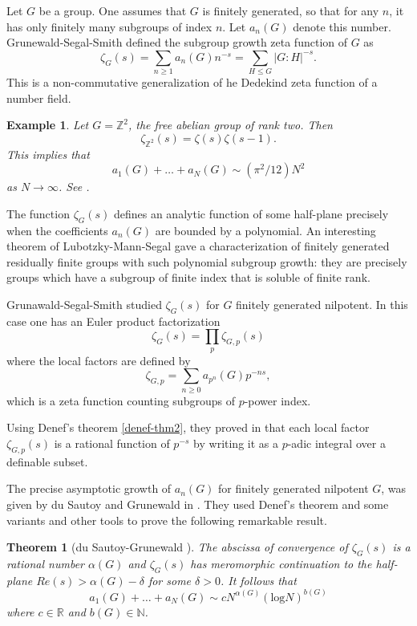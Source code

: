 \documentclass[12pt]{amsart}
\def\R{\mathbb{R}}
\def\N{\mathbb{N}}
\def\Z{\mathbb{Z}}
\def\R{\mathbb{R}}
\newtheorem{thm}{Theorem}[section]
\newtheorem{ex}{Example}[section]
\numberwithin{equation}{section}
\begin{document}
Let $G$ be a group. One assumes that $G$ is finitely generated, so that for any $n$, it has only finitely 
many subgroups of index $n$. Let $a_n(G)$ denote this number. Grunewald-Segal-Smith 
defined the subgroup growth zeta function of $G$ as 
$$\zeta_G(s)=\sum_{n\geq 1} a_n(G) n^{-s}=\sum_{H \leq G} |G:H|^{-s}.$$
This is a non-commutative generalization of he Dedekind zeta function of a number field.

\begin{ex} Let $G=\Z^2$, the free abelian group of rank two. Then $$\zeta_{\Z^2}(s)=\zeta(s)\zeta(s-1).$$ 
This implies that 
$$a_1(G)+\dots+a_N(G) \sim (\pi^2/12)N^2$$
as $N\rightarrow \infty$. See \cite{alex-dan-book}.

\end{ex}

The function $\zeta_G(s)$ defines an analytic function of some half-plane precisely when the coefficients $a_n(G)$ 
are bounded by a polynomial. An interesting theorem of Lubotzky-Mann-Segal \cite{LMS} gave a characterization of finitely generated residually finite groups with such polynomial subgroup growth: they are precisely groups which have a subgroup 
of finite index that is soluble of finite rank.

Grunawald-Segal-Smith \cite{GSS} studied $\zeta_G(s)$ for $G$ finitely generated nilpotent. In this case one has an Euler product factorization
$$\zeta_G(s)=\prod_p \zeta_{G,p}(s)$$
where the local factors are defined by
$$\zeta_{G,p}=\sum_{n\geq 0} a_{p^n}(G)p^{-ns},$$
which is a zeta function counting subgroups of $p$-power index.

Using Denef's theorem \ref{denef-thm2}, they proved in \cite{GSS} that each local factor $\zeta_{G,p}(s)$ is a rational function of $p^{-s}$ by writing it as a $p$-adic integral over a definable subset.

The precise asymptotic growth of $a_n(G)$ for finitely generated nilpotent $G$, 
was given by du Sautoy and Grunewald in \cite{dsG}. They used Denef's theorem and some variants and other tools to prove the following remarkable result.

\begin{thm}[du Sautoy-Grunewald \cite{dsG}] \label{dsG} The abscissa of convergence of $\zeta_G(s)$ is a rational number $\alpha(G)$ and $\zeta_G(s)$ has meromorphic continuation to the half-plane $Re(s)>\alpha(G)-\delta$ for some $\delta>0$. It follows that 
$$a_1(G)+\dots+a_N(G) \sim cN^{\alpha(G)} (\mathrm{log} N)^{b(G)}$$
where $c\in \R$ and $b(G)\in \N$.\end{thm}
\end{document}
